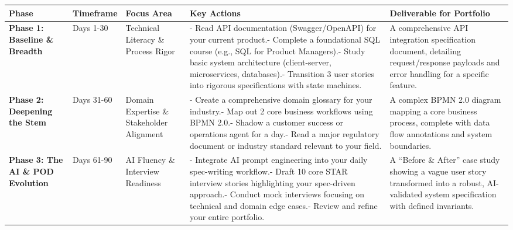 \begin{longtable}[]{@{}
  >{\raggedright\arraybackslash}p{}
  >{\raggedright\arraybackslash}p{}
  >{\raggedright\arraybackslash}p{}
  >{\raggedright\arraybackslash}p{}
  >{\raggedright\arraybackslash}p{}@{}}
\toprule\noalign{}
\begin{minipage}[b]{\linewidth}\raggedright
Phase
\end{minipage} & \begin{minipage}[b]{\linewidth}\raggedright
Timeframe
\end{minipage} & \begin{minipage}[b]{\linewidth}\raggedright
Focus Area
\end{minipage} & \begin{minipage}[b]{\linewidth}\raggedright
Key Actions
\end{minipage} & \begin{minipage}[b]{\linewidth}\raggedright
Deliverable for Portfolio
\end{minipage} \\
\midrule\noalign{}
\endhead
\bottomrule\noalign{}
\endlastfoot
\textbf{Phase 1: Baseline \& Breadth} & Days 1-30 & Technical Literacy
\& Process Rigor & - Read API documentation (Swagger/OpenAPI) for your
current product.- Complete a foundational SQL course (e.g., SQL for
Product Managers).- Study basic system architecture (client-server,
microservices, databases).- Transition 3 user stories into rigorous
specifications with state machines. & A comprehensive API integration
specification document, detailing request/response payloads and error
handling for a specific feature. \\
\textbf{Phase 2: Deepening the Stem} & Days 31-60 & Domain Expertise \&
Stakeholder Alignment & - Create a comprehensive domain glossary for
your industry.- Map out 2 core business workflows using BPMN 2.0.-
Shadow a customer success or operations agent for a day.- Read a major
regulatory document or industry standard relevant to your field. & A
complex BPMN 2.0 diagram mapping a core business process, complete with
data flow annotations and system boundaries. \\
\textbf{Phase 3: The AI \& POD Evolution} & Days 61-90 & AI Fluency \&
Interview Readiness & - Integrate AI prompt engineering into your daily
spec-writing workflow.- Draft 10 core STAR interview stories
highlighting your spec-driven approach.- Conduct mock interviews
focusing on technical and domain edge cases.- Review and refine your
entire portfolio. & A ``Before \& After'' case study showing a vague
user story transformed into a robust, AI-validated system specification
with defined invariants. \\
\end{longtable}

